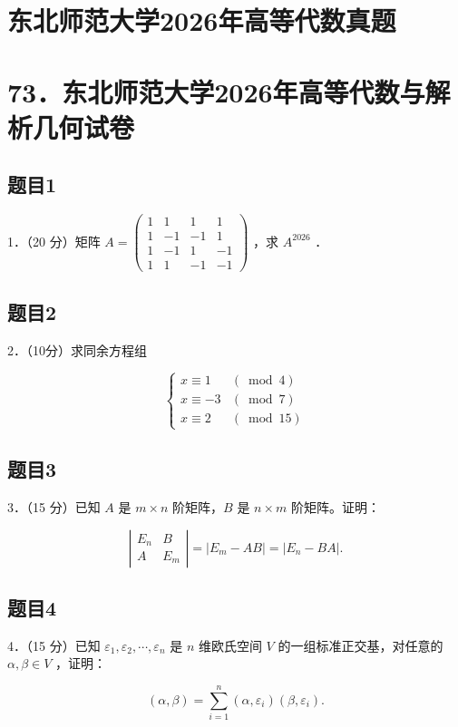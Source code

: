 \documentclass{article}
\begin{document}
\section*{东北师范大学2026年高等代数真题}
\section*{73．东北师范大学2026年高等代数与解析几何试卷}

\subsection{题目1}
1．（20 分）矩阵 \(A=\left(\begin{array}{cccc}1 & 1 & 1 & 1 \\ 1 & -1 & -1 & 1 \\ 1 & -1 & 1 & -1 \\ 1 & 1 & -1 & -1\end{array}\right)\) ，求 \(A^{2026}\) ．

\subsection{题目2}
2．（10分）求同余方程组

\[
\begin{cases}x \equiv 1 & (\bmod 4) \\ x \equiv-3 & (\bmod 7) \\ x \equiv 2 & (\bmod 15)\end{cases}
\]

\subsection{题目3}
3．（15 分）已知 \(A\) 是 \(m \times n\) 阶矩阵，\(B\) 是 \(n \times m\) 阶矩阵。证明：

\[
\left|\begin{array}{cc}
E_{n} & B \\
A & E_{m}
\end{array}\right|=\left|E_{m}-A B\right|=\left|E_{n}-B A\right| .
\]

\subsection{题目4}
4．（15 分）已知 \(\varepsilon_{1}, \varepsilon_{2}, \cdots, \varepsilon_{n}\) 是 \(n\) 维欧氏空间 \(V\) 的一组标准正交基，对任意的 \(\alpha, \beta \in V\) ，证明：

\[
(\alpha, \beta)=\sum_{i=1}^{n}\left(\alpha, \varepsilon_{i}\right)\left(\beta, \varepsilon_{i}\right) .
\]
\end{document}
